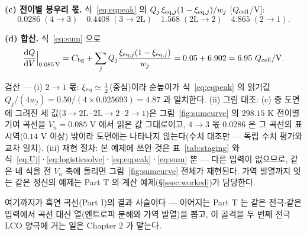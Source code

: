 \textbf{(c) 전이별 봉우리 몫.} 식~\eqref{eq:eqpeak} 의 $Q_j\,\xi_{\mathrm{eq},j}(1-\xi_{\mathrm{eq},j})/w_j$ [$Q_{\mathrm{cell}}$/V]:
\[
0.0286\;(4\!\to\!3)\quad 0.4408\;(3\!\to\!2\mathrm L)\quad 1.568\;(2\mathrm L\!\to\!2)\quad 4.865\;(2\!\to\!1).
\]

\textbf{(d) 합산.} 식~\eqref{eq:sum} 으로
\[
\frac{\mathrm{d} Q}{\mathrm{d} V}\Big|_{0.085\,\mathrm V}=C_{\mathrm{bg}}+\sum_j Q_j\frac{\xi_{\mathrm{eq},j}(1-\xi_{\mathrm{eq},j})}{w_j}
=0.05+6.902=6.95\ Q_{\mathrm{cell}}/\mathrm{V}.
\]
\begin{verifybox}
검산 --- (i) $2\!\to\!1$ 몫: $\xi_{\mathrm{eq}}\simeq\tfrac12$(중심)이라 순높이가 식~\eqref{eq:eqpeak} 의 읽기값
$Q_j/(4w_j)=0.50/(4\times0.025693)=4.87$ 과 일치한다. (ii) 그림 대조: (c) 중 도면에 그려진 세 값($3\!\to\!2\mathrm L\cdot2\mathrm L\!\to\!2\cdot2\!\to\!1$)은
그림~\ref{fig:sumcurve} 의 $298.15$ K 전이별 기여 곡선을 $V_n=0.085$ V 에서 읽은 값 그대로이고, $4\!\to\!3$ 몫 $0.0286$ 은 그 곡선의 표시역($0.14$ V 이상) 밖이라 도면에는 나타나지 않는다(수치 대조만 --- 독립
수치 평가와 교차 일치). (iii) 재현 절차: 본 예제에 쓰인 것은 표~\ref{tab:staging} 와
식~\eqref{eq:Uj}·\eqref{eq:logisticsolve}·\eqref{eq:eqpeak}·\eqref{eq:sum} 뿐 --- 다른 입력이 없으므로,
같은 네 식을 전 $V_n$ 축에 돌리면 그림~\ref{fig:sumcurve} 전체가 재현된다. 가역 발열까지 잇는 같은
정신의 예제는 Part T 의 계산 예제(\S\ref{ssec:worked})가 담당한다.
\end{verifybox}


여기까지가 흑연 곡선(Part I)의 결과 사슬이다 --- 이어지는 Part T 는 같은 전극$\cdot$같은 입력에서 곡선
대신 열(엔트로피 분해와 가역 발열)을 뽑고, 이 골격을 두 번째 전극 LCO 양극에 거는 일은 Chapter 2 가 맡는다.

